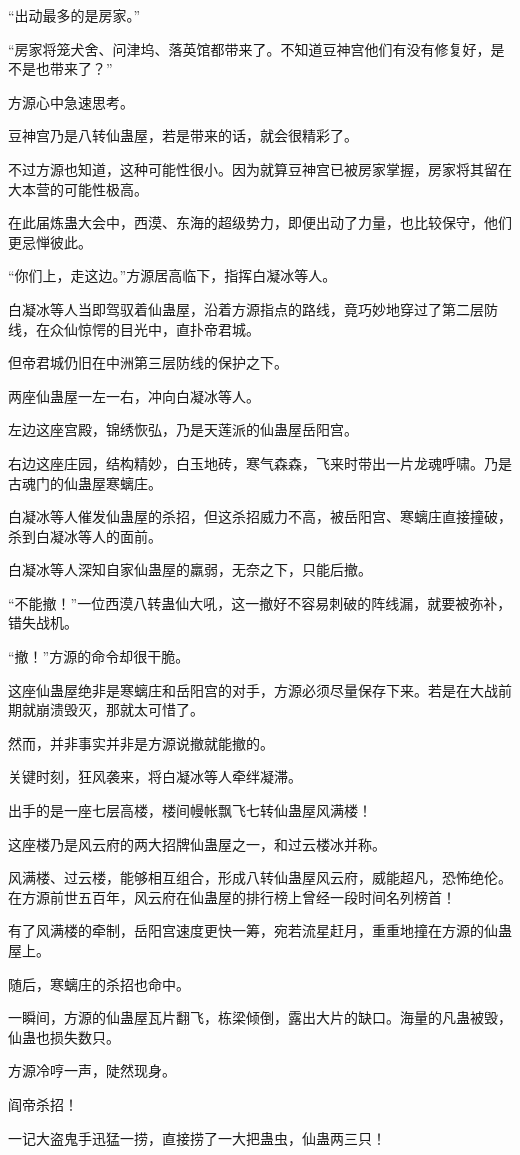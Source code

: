 \begin{this_body}
“出动最多的是房家。”

“房家将笼犬舍、问津坞、落英馆都带来了。不知道豆神宫他们有没有修复好，是不是也带来了？”

方源心中急速思考。

豆神宫乃是八转仙蛊屋，若是带来的话，就会很精彩了。

不过方源也知道，这种可能性很小。因为就算豆神宫已被房家掌握，房家将其留在大本营的可能性极高。

在此届炼蛊大会中，西漠、东海的超级势力，即便出动了力量，也比较保守，他们更忌惮彼此。

“你们上，走这边。”方源居高临下，指挥白凝冰等人。

白凝冰等人当即驾驭着仙蛊屋，沿着方源指点的路线，竟巧妙地穿过了第二层防线，在众仙惊愕的目光中，直扑帝君城。

但帝君城仍旧在中洲第三层防线的保护之下。

两座仙蛊屋一左一右，冲向白凝冰等人。

左边这座宫殿，锦绣恢弘，乃是天莲派的仙蛊屋岳阳宫。

右边这座庄园，结构精妙，白玉地砖，寒气森森，飞来时带出一片龙魂呼啸。乃是古魂门的仙蛊屋寒螭庄。

白凝冰等人催发仙蛊屋的杀招，但这杀招威力不高，被岳阳宫、寒螭庄直接撞破，杀到白凝冰等人的面前。

白凝冰等人深知自家仙蛊屋的羸弱，无奈之下，只能后撤。

“不能撤！”一位西漠八转蛊仙大吼，这一撤好不容易刺破的阵线漏，就要被弥补，错失战机。

“撤！”方源的命令却很干脆。

这座仙蛊屋绝非是寒螭庄和岳阳宫的对手，方源必须尽量保存下来。若是在大战前期就崩溃毁灭，那就太可惜了。

然而，并非事实并非是方源说撤就能撤的。

关键时刻，狂风袭来，将白凝冰等人牵绊凝滞。

出手的是一座七层高楼，楼间幔帐飘飞七转仙蛊屋风满楼！

这座楼乃是风云府的两大招牌仙蛊屋之一，和过云楼冰并称。

风满楼、过云楼，能够相互组合，形成八转仙蛊屋风云府，威能超凡，恐怖绝伦。在方源前世五百年，风云府在仙蛊屋的排行榜上曾经一段时间名列榜首！

有了风满楼的牵制，岳阳宫速度更快一筹，宛若流星赶月，重重地撞在方源的仙蛊屋上。

随后，寒螭庄的杀招也命中。

一瞬间，方源的仙蛊屋瓦片翻飞，栋梁倾倒，露出大片的缺口。海量的凡蛊被毁，仙蛊也损失数只。

方源冷哼一声，陡然现身。

阎帝杀招！

一记大盗鬼手迅猛一捞，直接捞了一大把蛊虫，仙蛊两三只！

\end{this_body}

